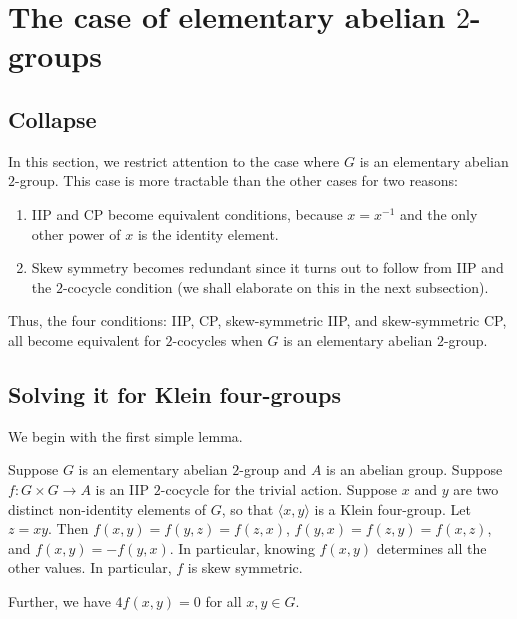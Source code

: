 \documentclass[10pt]{amsart}
\begin{document}
\section{The case of elementary abelian $2$-groups}

\subsection{Collapse}

In this section, we restrict attention to the case where $G$ is an
elementary abelian $2$-group. This case is more tractable than the
other cases for two reasons:

\begin{enumerate}
\item IIP and CP become equivalent conditions, because $x = x^{-1}$
  and the only other power of $x$ is the identity element.
\item Skew symmetry becomes redundant since it turns out to follow
  from IIP and the $2$-cocycle condition (we shall elaborate on this
  in the next subsection).
\end{enumerate}

Thus, the four conditions: IIP, CP, skew-symmetric IIP, and
skew-symmetric CP, all become equivalent for $2$-cocycles when $G$ is
an elementary abelian $2$-group.

\subsection{Solving it for Klein four-groups}

We begin with the first simple lemma.

\begin{lemma}
  Suppose $G$ is an elementary abelian $2$-group and $A$ is an abelian
  group. Suppose $f: G \times G \to A$ is an IIP $2$-cocycle for the
  trivial action. Suppose $x$ and $y$ are two distinct non-identity
  elements of $G$, so that $\langle x,y \rangle$ is a Klein
  four-group. Let $z = xy$. Then $f(x,y) = f(y,z) = f(z,x)$, $f(y,x) =
  f(z,y) = f(x,z)$, and $f(x,y) = -f(y,x)$. In particular, knowing
  $f(x,y)$ determines all the other values. In particular, $f$ is
  skew symmetric.

  Further, we have $4f(x,y) = 0$ for all $x,y \in G$.
\end{lemma}
\end{document}
